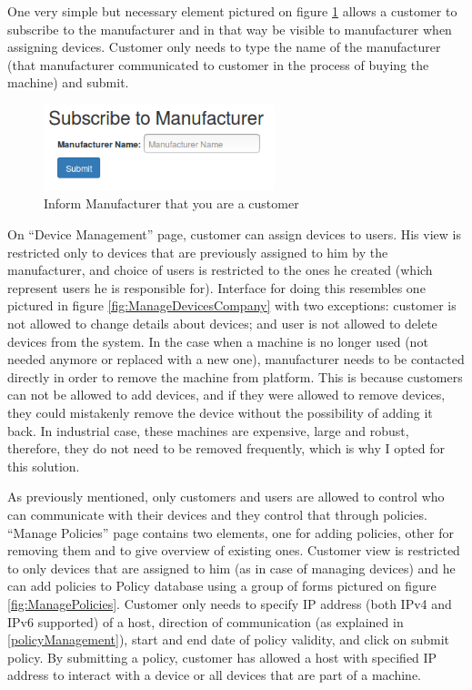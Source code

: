 One very simple but necessary element pictured on figure \ref{fig:SubscribeToManufacturer} allows a customer to subscribe to the manufacturer and in that way be visible to manufacturer when assigning devices. Customer only needs to type the name of the manufacturer (that manufacturer communicated to customer in the process of buying the machine) and submit.

\begin{figure}[ht]
	\begin{center}
		\includegraphics[width=0.6\textwidth]{images/implementation/SubscribeToManufacturer}
		\caption{Inform Manufacturer that you are a customer}
		\label{fig:SubscribeToManufacturer}
	\end{center}
\end{figure}

On ``Device Management'' page, customer can assign devices to users. His view is restricted only to devices that are previously assigned to him by the manufacturer, and choice of users is restricted to the ones he created (which represent users he is responsible for). Interface for doing this resembles one pictured in figure \ref{fig:ManageDevicesCompany} with two exceptions: customer is not allowed to change details about devices; and user is not allowed to 
delete devices from the system. In the case when a machine is no longer used (not needed anymore or replaced with a new one), manufacturer needs to be contacted directly in order to remove the machine from platform. This is because customers can not be allowed to add devices, and if they were allowed to remove devices, they could mistakenly remove the device without the possibility of adding it back. In industrial case, these machines are expensive, large and robust, therefore, they do not need to be removed frequently, which is why I opted for this solution.

As previously mentioned, only customers and users are allowed to control who can communicate with their devices and they control that through policies. ``Manage Policies'' page contains two elements, one for adding policies, other for removing them and to give overview of existing ones. Customer view is restricted to only devices that are assigned to him (as in case of managing devices) and he can add policies to Policy database using a group of forms pictured on figure \ref{fig:ManagePolicies}. Customer only needs to specify IP address (both IPv4 and IPv6 supported) of a host, direction of communication (as explained in \ref{policyManagement}), start and end date of policy validity, and click on submit policy. By submitting a policy, customer has allowed a host with specified IP address to interact with a device or all devices that are part of a machine.

